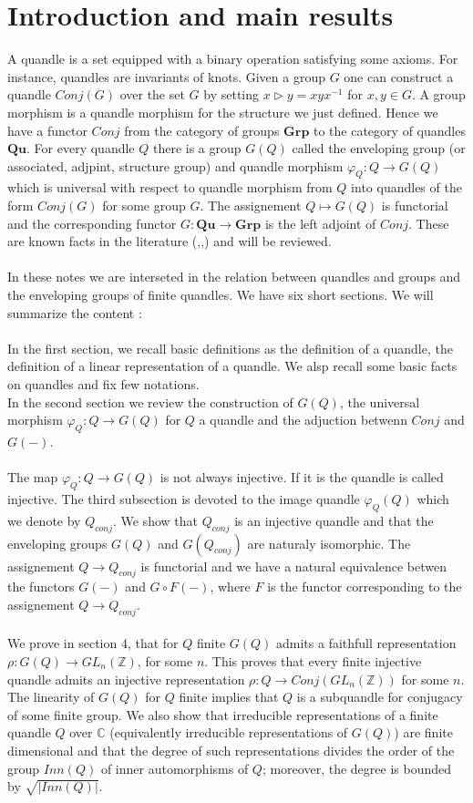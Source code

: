 \documentclass[12pt, reqno]{amsart}
\newcommand{\Z}{ {\mathbb Z} }
\newcommand{\C}{ {\mathbb C} }
\newcommand{\Q}{{\mathbf{Qu}}}
\newcommand{\G}{{\mathbf{Grp}}}
\begin{document}
\section*{Introduction and main results}
A quandle is a set equipped with a binary operation satisfying some axioms. For instance, quandles are invariants of knots. Given a group $G$ one can construct a quandle $Conj(G)$ over the set $G$ by setting $x\triangleright y= xyx^{-1}$ for $x,y\in G$. A group morphism is a quandle morphism for the structure we just defined. Hence we have a functor $Conj$ from the category of groups $\G$ to the category of quandles $\Q$. For every quandle $Q$ there is a group $G(Q)$ called the enveloping group (or associated, adjpint, structure group) and quandle morphism $\varphi_Q:Q\to G(Q)$ which is universal with respect to quandle morphism from $Q$ into quandles of the form $Conj(G)$ for some group $G$. The assignement $Q\mapsto G(Q)$ is functorial and the corresponding functor $G:\Q \to \G$ is the left adjoint of $Conj$. These are known facts in the literature (\cite{DJ},\cite{Br},\cite{FR}) and will be reviewed. \\\\
In these notes we are interseted in the relation between quandles and groups and the enveloping groups of finite quandles. We have six short sections. We will summarize the content :\\\\
In the first section, we recall basic definitions as the definition of a quandle, the definition of a linear representation of a quandle. We alsp recall some basic facts on quandles and fix few notations.\\
In the second section we review the construction of $G(Q)$, the universal morphism $\varphi_Q : Q\to G(Q)$ for $Q$ a quandle and the adjuction betwenn $Conj$ and $G(-)$.\\\\
The map $\varphi_Q :Q\to G(Q)$ is not always injective. If it is the quandle is called injective. The third subsection is devoted to the image quandle $\varphi_Q(Q)$ which we denote by $Q_{conj}$. We show that $Q_{conj}$ is an injective quandle and that the enveloping groups $G(Q)$ and $G(Q_{conj})$ are naturaly isomorphic. The assignement $Q\to Q_{conj}$ is functorial and we have a natural equivalence betwen the functors $G(-)$ and $G\circ F(-)$, where $F$ is the functor corresponding to the assignement $Q\to Q_{conj}$.\\\\
We prove in section 4, that for $Q$ finite $G(Q)$ admits a faithfull representation $\rho : G(Q) \to GL_n(\Z)$, for some $n$. This proves that every finite injective quandle admits an injective representation $\rho : Q \to Conj(GL_n(\Z))$ for some $n$. The linearity of $G(Q)$ for $Q$ finite implies that $Q$ is a subquandle for conjugacy of some finite group. We also show that irreducible representations of a finite quandle $Q$ over $\C$ (equivalently irreducible representations of $G(Q)$) are finite dimensional and that the degree of such representations divides the order of the group $Inn(Q)$ of inner automorphisms of $Q$; moreover, the degree is bounded by $\sqrt{\vert Inn(Q) \vert }$.\\\\
\end{document}
